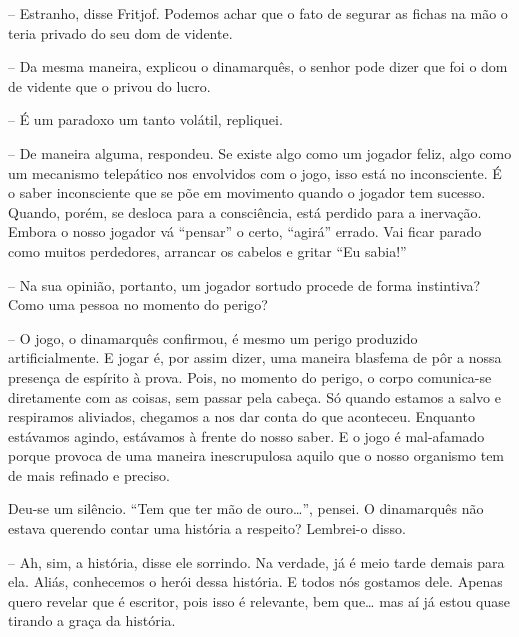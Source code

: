 -- Estranho, disse Fritjof. Podemos achar que o fato de segurar as
fichas na mão o teria privado do seu dom de vidente.

-- Da mesma maneira, explicou o dinamarquês, o senhor pode dizer que foi
o dom de vidente que o privou do lucro.

-- É um paradoxo um tanto volátil, repliquei.

-- De maneira alguma, respondeu. Se existe algo como um jogador feliz,
algo como um mecanismo telepático nos envolvidos com o jogo, isso está
no inconsciente. É o saber inconsciente que se põe em movimento quando o
jogador tem sucesso. Quando, porém, se desloca para a consciência, está
perdido para a inervação. Embora o nosso jogador vá ``pensar'' o certo,
``agirá'' errado. Vai ficar parado como muitos perdedores, arrancar os
cabelos e gritar ``Eu sabia!''

-- Na sua opinião, portanto, um jogador sortudo procede de forma
instintiva? Como uma pessoa no momento do perigo?

-- O jogo, o dinamarquês confirmou, é mesmo um perigo produzido
artificialmente. E jogar é, por assim dizer, uma maneira blasfema de pôr
a nossa presença de espírito à prova. Pois, no momento do perigo, o
corpo comunica-se diretamente com as coisas, sem passar pela cabeça. Só
quando estamos a salvo e respiramos aliviados, chegamos a nos dar conta
do que aconteceu. Enquanto estávamos agindo, estávamos à frente do nosso
saber. E o jogo é mal-afamado porque provoca de uma maneira
inescrupulosa aquilo que o nosso organismo tem de mais refinado e
preciso.

Deu-se um silêncio. ``Tem que ter mão de ouro\ldots{}'', pensei. O
dinamarquês não estava querendo contar uma história a respeito?
Lembrei-o disso.

-- Ah, sim, a história, disse ele sorrindo. Na verdade, já é meio tarde
demais para ela. Aliás, conhecemos o herói dessa história. E todos nós
gostamos dele. Apenas quero revelar que é escritor, pois isso é
relevante, bem que\ldots{} mas aí já estou quase tirando a graça da história.

